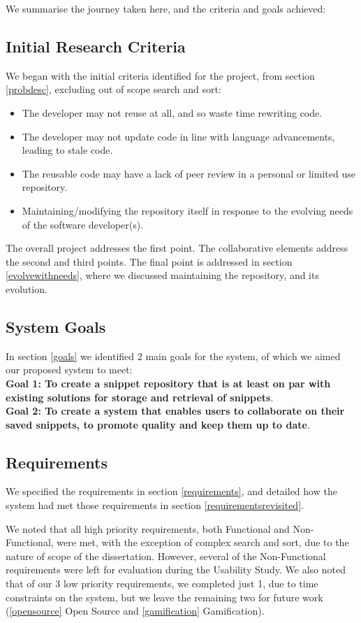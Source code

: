 We summarise the journey taken here, and the criteria and goals achieved:

\subsection{Initial Research Criteria}
We began with the initial criteria identified for the project, from section \ref{probdesc}, excluding out of scope search and sort:
\begin{itemize}
\item The developer may not reuse at all, and so waste time rewriting code.
\item The developer may not update code in line with language advancements, leading to stale code. 
\item The reusable code may have a lack of peer review in a personal or limited use repository.
\item Maintaining/modifying the repository itself in response to the evolving needs of the software developer(s). 
\end{itemize}

The overall project addresses the first point.
The collaborative elements address the second and third points.
The final point is addressed in section \ref{evolvewithneeds}, where we discussed maintaining the repository, and its evolution.

\subsection{System Goals}
In section \ref{goals} we identified 2 main goals for the system, of which we aimed our proposed system to meet: \\
\textbf{Goal 1: To create a snippet repository that is at least on par with existing solutions for storage and retrieval of snippets}. \\
\textbf{Goal 2: To create a system that enables users to collaborate on their saved snippets, to promote quality and keep them up to date}.

\subsection{Requirements}
We specified the requirements in section \ref{requirements}, and detailed how the system had met those requirements in section \ref{requirementsrevisited}.

We noted that all high priority requirements, both Functional and Non-Functional, were met, with the exception of complex search and sort, due to the nature of scope of the dissertation.
However, several of the Non-Functional requirements were left for evaluation during the Usability Study.
We also noted that of our 3 low priority requirements, we completed just 1, due to time constraints on the system, but we leave the remaining two for future work (\ref{opensource} Open Source and \ref{gamification} Gamification).

